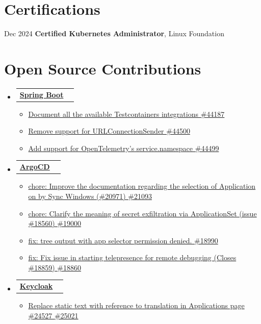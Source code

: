 \documentclass[a4paper,12pt]{article}
\makeatletter
\newcommand{\resumeItem}[1]{
	\item\small{
		{#1 \vspace{-2pt}}
	}
}
\newcommand{\resumeSubheadingSingleLine}[2]{
	\vspace{-2pt}\item
	\begin{tabular*}{0.97\textwidth}[t]{l@{\extracolsep{\fill}}r}
		\textbf{#1} & #2
	\end{tabular*}\vspace{-7pt}
}
\newcommand{\resumeSubHeadingListStart}{\begin{itemize}[leftmargin=0.15in, label={}]}
\newcommand{\resumeSubHeadingListEnd}{\end{itemize}}
\newcommand{\resumeItemListStart}{\begin{itemize}}
\newcommand{\resumeItemListEnd}{\end{itemize}\vspace{-5pt}}
\makeatother
\begin{document}
	\section{Certifications}
	\begin{itemize}[leftmargin=0.15in, label={}]
		\small {
			\item Dec 2024 \quad \textbf{Certified Kubernetes Administrator}, Linux Foundation
		}
	\end{itemize}
	

	\section{Open Source Contributions}
		\resumeSubHeadingListStart
			\resumeSubheadingSingleLine{ \href{https://github.com/spring-projects/spring-boot/pulls/thecooldrop}{Spring Boot}}{}{}{}
				\resumeItemListStart[label=]
					\resumeItem{\href{https://github.com/spring-projects/spring-boot/pull/44187}{Document all the available Testcontainers integrations \#44187}}
					\resumeItem{\href{https://github.com/spring-projects/spring-boot/pull/44500}{Remove support for URLConnectionSender \#44500}}
					\resumeItem{\href{https://github.com/spring-projects/spring-boot/pull/44499}{Add support for OpenTelemetry's service.namespace \#44499}}
				\resumeItemListEnd
			\resumeSubheadingSingleLine{ \href{https://github.com/argoproj/argo-cd/pulls/thecooldrop}{ArgoCD}}{}{}{}
				\resumeItemListStart[label=]
					\resumeItem{\href{https://github.com/argoproj/argo-cd/pull/21093}{chore: Improve the documentation regarding the selection of Application on by Sync Windows (\#20971) \#21093}}
					\resumeItem{\href{https://github.com/argoproj/argo-cd/pull/19000}{chore: Clarify the meaning of secret exfiltration via ApplicationSet (issue \#18560) \#19000}}
					\resumeItem{\href{https://github.com/argoproj/argo-cd/pull/18990}{fix: tree output with app selector permission denied. \#18990}}
					\resumeItem{\href{https://github.com/argoproj/argo-cd/pull/18860}{fix: Fix issue in starting telepresence for remote debugging (Closes \#18859) \#18860}}
				\resumeItemListEnd
			\resumeSubheadingSingleLine{ \href{https://github.com/keycloak/keycloak/pulls/thecooldrop}{Keycloak}}{}{}{}
				\resumeItemListStart[label=]
				\resumeItem{\href{https://github.com/keycloak/keycloak/pull/25021}{Replace static text with reference to translation in Applications page \#24527 \#25021}}
				\resumeItemListEnd
		\resumeSubHeadingListEnd
	
\end{document}
